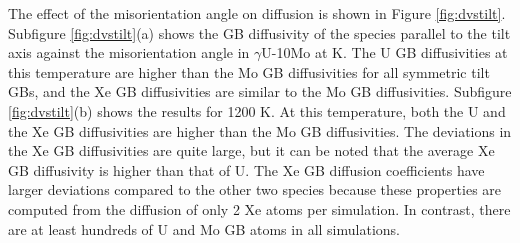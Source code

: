 \documentclass{elsarticle}
\providecommand{\DIFadd}[1]{{\protect\color{blue} \sf #1}} %
\providecommand{\DIFdel}[1]{}
\providecommand{\DIFaddbegin}{} %
\providecommand{\DIFaddend}{} %
\providecommand{\DIFdelbegin}{} %
\providecommand{\DIFdelend}{} %
\begin{document}
The effect of \DIFaddbegin \DIFadd{the }\DIFaddend misorientation angle on diffusion is shown in Figure \ref{fig:dvstilt}. \DIFdelbegin \DIFdel{Figure }\DIFdelend \DIFaddbegin \DIFadd{Subfigure }\DIFaddend \ref{fig:dvstilt}(a) shows the GB diffusivity of the species \DIFdelbegin \DIFdel{against }\DIFdelend \DIFaddbegin \DIFadd{parallel to the tilt axis against the }\DIFaddend misorientation angle in $\gamma$U-10Mo at \DIFdelbegin \DIFdel{800 K. Figure }\DIFdelend \DIFaddbegin \DIFadd{600 K. The U GB diffusivities at this temperature are higher than the Mo GB diffusivities for all symmetric tilt GBs, and the Xe GB diffusivities are similar to the Mo GB diffusivities. Subfigure }\DIFaddend \ref{fig:dvstilt}(b) shows \DIFdelbegin \DIFdel{similar results but at }\DIFdelend \DIFaddbegin \DIFadd{the results for }\DIFaddend 1200 K. \DIFdelbegin \DIFdel{Since these are bcc structures, having a 90$^{\circ}$ tilt means it is a perfect lattice without any GBs. GBs having a misorientation angle of less than 15 degrees (or more than 75 degrees) are defined as low-angle GBs (LAGB) and those having more than 15 degrees (or less than 75 degrees) of misorientation are defined as high-angle GBs (HAGB) for the purpose of this discussion. It is observed that LAGBs have slightly lower diffusivities than HAGBs.
At low temperatures, all HAGBs have similar diffusivities, and the effect of misorientation on these boundaries is not pronounced, with the exception of the }\DIFdelend \DIFaddbegin \DIFadd{At this temperature, both the U and the Xe GB diffusivities are higher than the Mo GB diffusivities. The deviations in the Xe GB diffusivities are quite large, but it can be noted that the average Xe GB diffusivity is higher than that of U. The Xe GB diffusion coefficients have larger deviations compared to the other two species because these properties are computed from the diffusion of only 2 Xe atoms per simulation. In contrast, there are at least hundreds of U and Mo GB atoms in all simulations.
}
\end{document}
